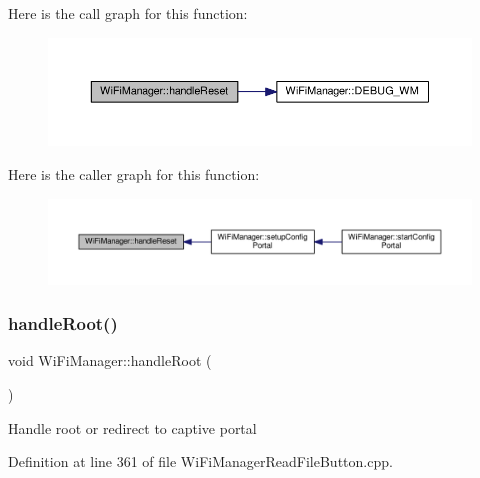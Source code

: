 Here is the call graph for this function\+:\nopagebreak
\begin{figure}[H]
\begin{center}
\leavevmode
\includegraphics[width=350pt]{class_wi_fi_manager_a94fb1a8fcfbd0d02714c69138bf72f9c_cgraph}
\end{center}
\end{figure}
Here is the caller graph for this function\+:\nopagebreak
\begin{figure}[H]
\begin{center}
\leavevmode
\includegraphics[width=350pt]{class_wi_fi_manager_a94fb1a8fcfbd0d02714c69138bf72f9c_icgraph}
\end{center}
\end{figure}
\mbox{\label{class_wi_fi_manager_a47e4c7df7478f690c53ff9f5125c9760}} 
\subsubsection{\texorpdfstring{handle\+Root()}{handleRoot()}}
{\footnotesize\ttfamily void Wi\+Fi\+Manager\+::handle\+Root (\begin{DoxyParamCaption}{ }\end{DoxyParamCaption})\hspace{0.3cm}{\ttfamily [private]}}

Handle root or redirect to captive portal 

Definition at line 361 of file Wi\+Fi\+Manager\+Read\+File\+Button.\+cpp.


